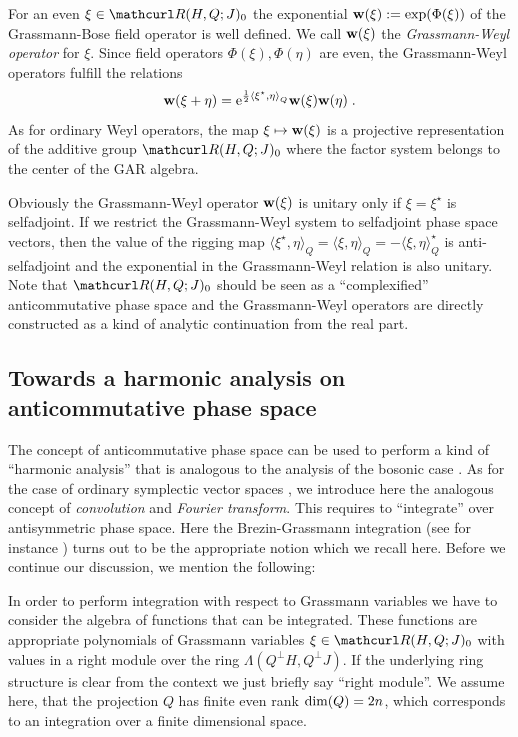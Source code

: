 \documentclass[pra,twoside,amsmath,amsfonts,amssymb,superscriptaddress,showpacs]{revtex4}
\def\1#1{{\bf #1}}
\def\8#1{{\rm #1}}
\def\9#1{{\mathcurl #1}}
\newcommand{\RIGG}[3]{{\langle}{#1},{#2}{\rangle}_{#3}}
\newcommand{\GR}[2]{\Lambda(#1,#2)}
\newcommand{\PHSP}[3]{\9R(#1,#3;#2)}
\newcommand{\ADJ}{\star}
\begin{document}
For an even $\xi\in\PHSP{H}{J}{Q}_0$ the exponential $\1w(\xi):=\exp(\Phi(\xi))$ of the
Grassmann-Bose field operator is well defined. We call $\1w(\xi)$ the \textit{Grassmann-Weyl
operator} for $\xi$. Since field operators $\Phi(\xi),\Phi(\eta)$ are even, the Grassmann-Weyl
operators fulfill the relations
\begin{equation}
\1w(\xi+\eta)=\8e^{\frac{1}{2}\RIGG{\xi^\ADJ}{\eta}{Q}}\1w(\xi)\1w(\eta) \; .
\end{equation}
As for ordinary Weyl operators, the map $\xi\mapsto \1w(\xi)$ is a projective representation of the
additive group $\PHSP{H}{J}{Q}_0$ where the factor system belongs to the center of the GAR algebra. 

Obviously the Grassmann-Weyl operator $\1w(\xi)$ is unitary only if $\xi=\xi^\ADJ$ is selfadjoint.
If we restrict the Grassmann-Weyl system to selfadjoint phase space vectors, then the value of the
rigging map $\RIGG{\xi^\ADJ}{\eta}{Q}=\RIGG{\xi}{\eta}{Q}=-\RIGG{\xi}{\eta}{Q}^\ADJ$ is
anti-selfadjoint and the exponential in the Grassmann-Weyl relation is also unitary.
Note that $\PHSP{H}{J}{Q}_0$ should be seen as a ``complexified'' anticommutative phase space and
the Grassmann-Weyl operators are directly constructed as a kind of analytic continuation from the
real part.


\subsection{Towards a harmonic analysis on anticommutative phase space}
\label{subsec:harmonic-analysis}
The concept of anticommutative phase space can be used to perform a kind of ``harmonic
analysis'' that is analogous to the analysis of the bosonic
case \cite{WeQMPS}. As for the case of ordinary
symplectic vector spaces \cite{WeQMPS}, we introduce here the analogous concept of {\em
convolution} and {\em Fourier transform}. This requires to ``integrate'' over
antisymmetric phase space. Here the Brezin-Grassmann integration (see for instance
\cite{VladVol84,VladVol84b,ChoBruDeWitt89}) turns out to be the appropriate notion which we recall
here. Before we continue our discussion, we mention the following:

In order to perform integration with respect to Grassmann variables we
have to consider the algebra of functions that can be integrated. These functions are appropriate
polynomials of Grassmann variables $\xi\in\PHSP{H}{J}{Q}_0$ with values in a right module over the
ring $\GR{Q^\perp H}{Q^\perp J}$. If the underlying ring structure is clear from the context we just
briefly say ``right module''. We assume here, that the projection $Q$ has finite even rank
$\8{dim}(Q)=2n$, which corresponds to an integration over a finite dimensional space.
\end{document}
